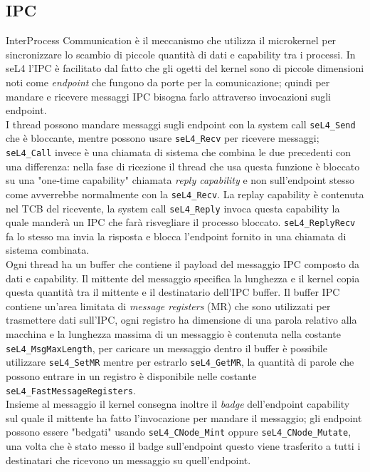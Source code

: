 \subsection{IPC}
InterProcess Communication è il meccanismo che utilizza il microkernel per sincronizzare lo scambio di  piccole quantità di dati e capability tra i processi. In seL4 l'IPC è facilitato dal fatto che gli ogetti del kernel sono di piccole dimensioni noti come \textit{endpoint} che fungono da porte per la comunicazione; quindi per mandare e ricevere messaggi IPC bisogna farlo attraverso invocazioni sugli endpoint.\\
I thread possono mandare messaggi sugli endpoint  con la system call \texttt{seL4\_Send} che è bloccante, mentre possono usare \texttt{seL4\_Recv} per ricevere messaggi; \texttt{seL4\_Call} invece è una chiamata di sistema che combina le due precedenti con una differenza: nella fase di ricezione il thread che usa questa funzione è bloccato su una "one-time capability" chiamata \textit{reply capability} e non sull'endpoint stesso come avverrebbe normalmente con la \texttt{seL4\_Recv}. La replay capability è contenuta nel TCB del ricevente, la system call \texttt{seL4\_Reply} invoca questa capability la quale manderà un IPC che farà risvegliare il processo bloccato. \texttt{seL4\_ReplyRecv} fa lo stesso ma invia la risposta e blocca l'endpoint fornito in una chiamata di sistema combinata.\\
Ogni thread ha un buffer che contiene il payload del messaggio IPC composto da dati e capability. Il mittente del messaggio specifica la lunghezza e il kernel copia questa quantità tra il mittente e il destinatario dell'IPC buffer. Il buffer IPC contiene  un'area limitata di \textit{message registers} (MR) che sono utilizzati per trasmettere dati sull'IPC, ogni registro ha dimensione di una parola relativo alla macchina e la lunghezza massima di un messaggio è contenuta nella costante \texttt{seL4\_MsgMaxLength}, per caricare un messaggio dentro il buffer è possibile utilizzare \texttt{seL4\_SetMR} mentre per estrarlo \texttt{seL4\_GetMR}, la quantità di parole che possono entrare in un registro è disponibile nelle costante \texttt{seL4\_FastMessageRegisters}.\\
Insieme al messaggio il kernel consegna inoltre il \textit{badge} dell'endpoint capability sul quale il mittente ha fatto l'invocazione per mandare il messaggio; gli endpoint possono essere "bedgati" usando \texttt{seL4\_CNode\_Mint} oppure \texttt{seL4\_CNode\_Mutate}, una volta che è stato messo il badge sull'endpoint questo viene trasferito a tutti i destinatari che ricevono un messaggio su quell'endpoint.\\
